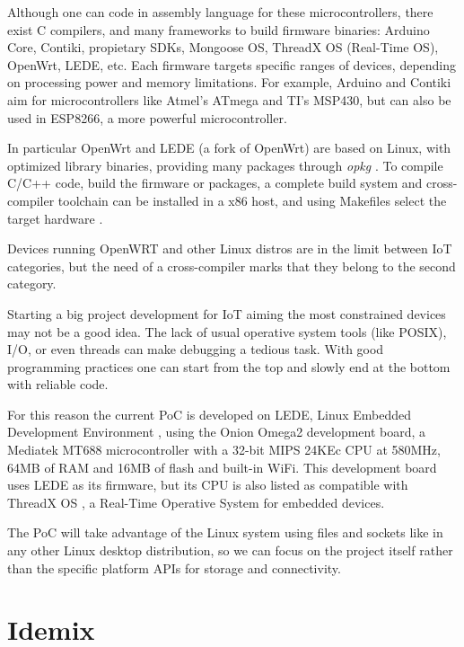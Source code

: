 Although one can code in assembly language for these microcontrollers, there exist C compilers, and many frameworks to build firmware binaries: Arduino Core, Contiki, propietary SDKs, Mongoose OS, ThreadX OS (Real-Time OS), OpenWrt, LEDE, etc. Each firmware targets specific ranges of devices, depending on processing power and memory limitations. For example, Arduino and Contiki aim for microcontrollers like Atmel's ATmega and TI's MSP430, but can also be used in ESP8266, a more powerful microcontroller.

In particular OpenWrt and LEDE (a fork of OpenWrt) are based on Linux, with optimized library binaries, providing many packages through \textit{opkg} \citep{opkg}. To compile C/C++ code, build the firmware or packages, a complete build system and cross-compiler toolchain can be installed in a x86 host, and using Makefiles select the target hardware \citep{openwrtbuildsystem}.

Devices running OpenWRT and other Linux distros are in the limit between \ac{IoT} categories, but the need of a cross-compiler marks that they belong to the second category.

Starting a big project development for \ac{IoT} aiming the most constrained devices may not be a good idea. The lack of usual operative system tools (like POSIX), I/O, or even threads can make debugging a tedious task. With good programming practices one can start from the top and slowly end at the bottom with reliable code.

For this reason the current \ac{PoC} is developed on LEDE, Linux Embedded Development Environment \citep{ledeproject}, using the Onion Omega2 development board, a Mediatek MT688 microcontroller \citep{MT7688} with a 32-bit MIPS 24KEc CPU at 580MHz, 64MB of RAM and 16MB of flash and built-in WiFi. This development board uses LEDE as its firmware, but its CPU is also listed as compatible with ThreadX OS \citep{THREADX}, a Real-Time Operative System for embedded devices.

The \ac{PoC} will take advantage of the Linux system using files and sockets like in any other Linux desktop distribution, so we can focus on the project itself rather than the specific platform APIs for storage and connectivity.




\section{Idemix}



